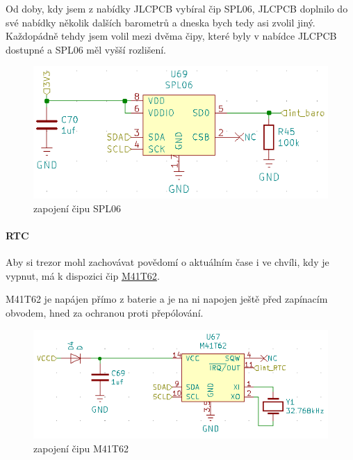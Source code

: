 Od doby, kdy jsem z nabídky JLCPCB vybíral čip SPL06, JLCPCB doplnilo do své nabídky několik dalších barometrů a dneska bych tedy asi zvolil jiný. Každopádně tehdy jsem volil 
mezi dvěma čipy, které byly v nabídce JLCPCB dostupné a SPL06 měl vyšší rozlišení.

\begin{figure}[htbp]
    \centering
    \includegraphics[width=\textwidth]{kapitoly/obrazky/E4/vnimani/SPL06.png}
    \caption{zapojení čipu SPL06}
    \label{fig:E4-SPL06}
\end{figure}

\newpage

\paragraph{RTC}
Aby si trezor mohl zachovávat povědomí o aktuálním čase i ve chvíli, kdy je vypnut, má k dispozici čip \href{https://datasheet.lcsc.com/szlcsc/STMicroelectronics-M41T62Q6F_C113207.pdf}{M41T62}.

M41T62 je napájen přímo z baterie a je na ni napojen ještě před zapínacím obvodem, hned za ochranou proti přepólování.

\begin{figure}[htbp]
    \centering
    \includegraphics[width=\textwidth]{kapitoly/obrazky/E4/vnimani/RTC.png}
    \caption{zapojení čipu M41T62}
    \label{fig:E4-M41T62}
\end{figure}

